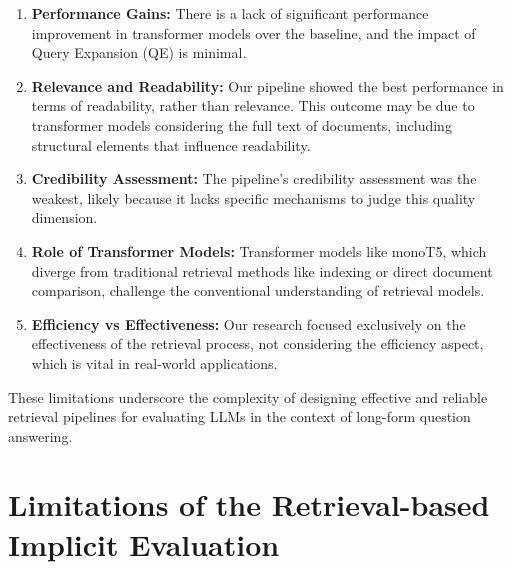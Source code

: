 \begin{enumerate}
    \item \textbf{Performance Gains:} There is a lack of significant performance improvement in transformer models over the baseline, and the impact of Query Expansion (QE) is minimal.
    \item \textbf{Relevance and Readability:} Our pipeline showed the best performance in terms of readability, rather than relevance. This outcome may be due to transformer models considering the full text of documents, including structural elements that influence readability.
    \item \textbf{Credibility Assessment:} The pipeline's credibility assessment was the weakest, likely because it lacks specific mechanisms to judge this quality dimension.
    \item \textbf{Role of Transformer Models:} Transformer models like monoT5, which diverge from traditional retrieval methods like indexing or direct document comparison, challenge the conventional understanding of retrieval models.
    \item \textbf{Efficiency vs Effectiveness:} Our research focused exclusively on the effectiveness of the retrieval process, not considering the efficiency aspect, which is vital in real-world applications.
\end{enumerate}

These limitations underscore the complexity of designing effective and reliable retrieval pipelines for evaluating LLMs in the context of long-form question answering.

\section{Limitations of the Retrieval-based Implicit Evaluation}

